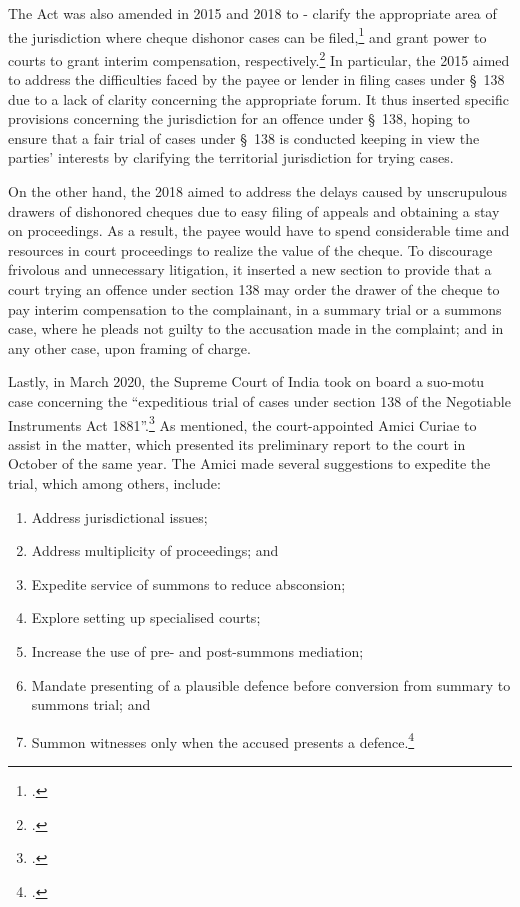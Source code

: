 \documentclass[12pt,a4paper]{article}
\begin{document}
	The Act was also amended in 2015 and 2018 to - clarify the appropriate area of the jurisdiction where cheque dishonor cases can be filed,\footcite{niAmend2015} and grant power to courts to grant interim compensation, respectively.\footcite{niAmend2018} In particular, the  2015 aimed to address the difficulties faced by the payee or lender in filing cases under \S~138 due to a lack of clarity concerning the appropriate forum. It thus inserted specific provisions concerning the jurisdiction for an offence under \S~138, hoping to ensure that a fair trial of cases under \S~138 is conducted keeping in view the parties' interests by clarifying the territorial jurisdiction for trying cases.
	
	On the other hand, the  2018 aimed to address the delays caused by unscrupulous drawers of dishonored cheques due to easy filing of appeals and obtaining a stay on proceedings. As a result, the payee would have to spend considerable time and resources in court proceedings to realize the value of the cheque. To discourage frivolous and unnecessary litigation, it inserted a new section to provide that a court trying an offence under section 138 may order the drawer of the cheque to pay interim compensation to the complainant, in a summary trial or a summons case, where he pleads not guilty to the accusation made in the complaint; and in any other case, upon framing of charge.
	
	Lastly, in March 2020, the Supreme Court of India took on board a suo-motu case concerning the “expeditious trial of cases under section 138 of the Negotiable Instruments Act 1881”.\footcite{sc2020_138} As mentioned, the court-appointed Amici Curiae to assist in the matter, which presented its preliminary report to the court in October of the same year. The Amici made several suggestions to expedite the trial, which among others, include:
	
	\begin{enumerate}[label=(\alph*)]
		\item Address jurisdictional issues;
		\item Address multiplicity of proceedings; and
		\item Expedite service of summons to reduce absconsion;
		\item Explore setting up specialised courts;
		\item Increase the use of pre- and post-summons mediation;
		\item Mandate presenting of a plausible defence before conversion from summary to summons trial; and
		\item Summon witnesses only when the accused presents a defence.\footcite{amicus2020_submission}
	\end{enumerate}
	
\end{document}
